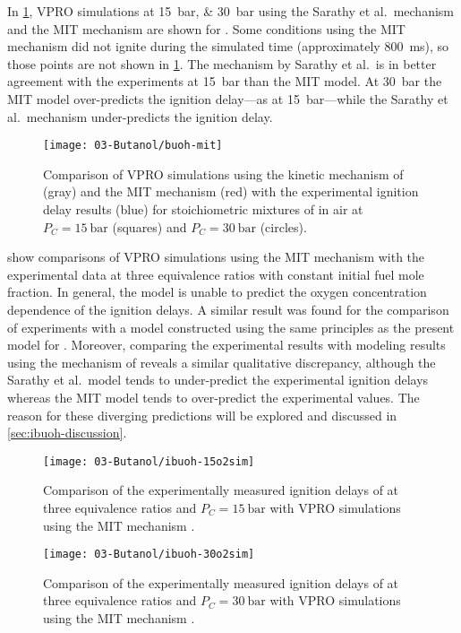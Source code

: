\documentclass[../main.tex]{subfiles}
\begin{document}
In \cref{fig:buoh-mit}, VPRO simulations at \SIlist{15;30}{\bar} using
the Sarathy et al.\ mechanism \cite{Sarathy2012} and the MIT mechanism
\cite{Weber2013a} are shown for \iBuOH{}. Some conditions using the MIT
mechanism did not ignite during the simulated time (approximately
\SI{800}{\milli\second}), so those points are not shown in
\cref{fig:buoh-mit}. The mechanism by Sarathy et al.\ is in better
agreement with the experiments at \SI{15}{\bar} than the MIT model. At
\SI{30}{\bar} the MIT model over-predicts the ignition delay---as at
\SI{15}{\bar}---while the Sarathy et al.\ mechanism under-predicts the
ignition delay.

\begin{figure}
\texttt{[image: 03-Butanol/buoh-mit]}
\caption{Comparison of VPRO simulations using the kinetic mechanism of
\textcite{Sarathy2012} (gray) and the MIT mechanism
\cite{Weber2013a} (red) with the experimental
ignition delay results (blue) for stoichiometric mixtures of
\iBuOH{} in air at $P_C=\SI{15}{\bar}$ (squares) and $P_C=\SI{30}{\bar}$
(circles).}
\label{fig:buoh-mit}
\end{figure}

 show comparisons of VPRO
simulations using the MIT mechanism with the experimental data at three
equivalence ratios with constant initial fuel mole fraction. In general,
the model is unable to predict the oxygen concentration dependence of the
ignition delays. A similar result was found for the comparison of
\nBuOH{} experiments with a model constructed using the same principles
as the present model for \iBuOH{} \cite{Weber2011}. Moreover, comparing
the experimental results with modeling results using the mechanism of
\textcite{Sarathy2012} reveals a similar qualitative discrepancy,
although the Sarathy et al.\ model tends to under-predict the experimental
ignition delays whereas the MIT model tends to over-predict the experimental
values. The reason for these diverging predictions will be explored and
discussed in \cref{sec:ibuoh-discussion}.

\begin{figure}
    \begin{floatrow}
    \ffigbox
        {\texttt{[image: 03-Butanol/ibuoh-15o2sim]}}
        {\caption{Comparison of the experimentally measured ignition
        delays of \iBuOH{} at three equivalence ratios and $P_C=\SI{15}{\bar}$
        with VPRO simulations using the MIT mechanism \cite{Weber2013a}.}
        \label{fig:ibuoh-15o2sim}}
    \ffigbox
        {\texttt{[image: 03-Butanol/ibuoh-30o2sim]}}
        {\caption{Comparison of the experimentally measured ignition
        delays of \iBuOH{} at three equivalence ratios and $P_C=\SI{30}{\bar}$
        with VPRO simulations using the MIT mechanism \cite{Weber2013a}.}
        \label{fig:ibuoh-30o2sim}}
    \end{floatrow}
\end{figure}
\end{document}
